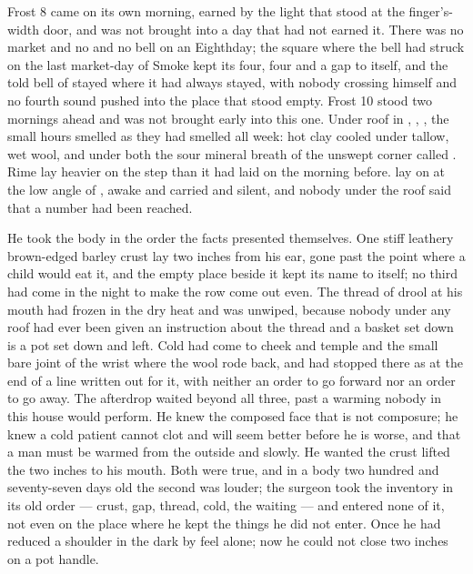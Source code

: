 
Frost 8 came on its own morning, earned by the light that stood at the finger's-width door, and was not brought into a day that had not earned it. There was no market and no  and no bell on an Eighthday; the square where the bell had struck on the last market-day of Smoke kept its four, four and a gap to itself, and the told bell of  stayed where it had always stayed, with nobody crossing himself and no fourth sound pushed into the place that stood empty. Frost 10 stood two mornings ahead and was not brought early into this one. Under  roof in , , , the small hours smelled as they had smelled all week: hot clay cooled under tallow, wet wool, and under both the sour mineral breath of the unswept corner called . Rime lay heavier on the step than it had laid on the morning before.  lay on  at the low angle of , awake and carried and silent, and nobody under the roof said that a number had been reached.

He took the body in the order the facts presented themselves. One stiff leathery brown-edged barley crust lay two inches from his ear, gone past the point where a child would eat it, and the empty place beside it kept its name to itself; no third had come in the night to make the row come out even. The thread of drool at his mouth had frozen in the dry heat and was unwiped, because nobody under any roof had ever been given an instruction about the thread and a basket set down is a pot set down and left. Cold had come to cheek and temple and the small bare joint of the wrist where the wool rode back, and had stopped there as at the end of a line written out for it, with neither an order to go forward nor an order to go away. The afterdrop waited beyond all three, past a warming nobody in this house would perform. He knew the composed face that is not composure; he knew a cold patient cannot clot and will seem better before he is worse, and that a man must be warmed from the outside and slowly. He wanted the crust lifted the two inches to his mouth. Both were true, and in a body two hundred and seventy-seven days old the second was louder; the surgeon took the inventory in its old order --- crust, gap, thread, cold, the waiting --- and entered none of it, not even on the place where he kept the things he did not enter. Once he had reduced a shoulder in the dark by feel alone; now he could not close two inches on a pot handle.

